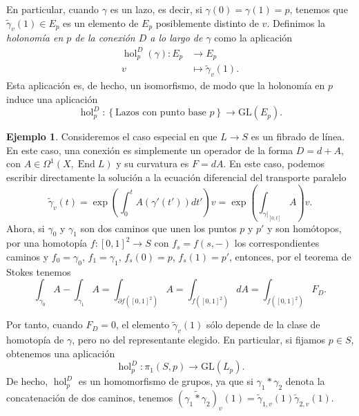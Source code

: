 \documentclass[12pt,a4paper]{article}
\theoremstyle{definition} \newtheorem{defn}[thm]{Definición}
\theoremstyle{definition} \newtheorem{ejemplo}[thm]{Ejemplo}
\theoremstyle{definition} \newtheorem{ejercicio}[thm]{Ejercicio}
\def\GL{\mathrm{GL}}
\DeclareMathOperator{\hol}{hol}
\DeclareMathOperator{\End}{End}
\begin{document}
	  En particular, cuando $\gamma$ es un lazo, es decir, si $\gamma(0)=\gamma(1)=p$, tenemos que $\tilde{\gamma}_v(1) \in E_p$ es un elemento de $E_p$ posiblemente distinto de $v$. Definimos la \emph{holonomía en $p$ de la conexión $D$ a lo largo de $\gamma$} como la aplicación
	  \begin{align*}
	    \hol^D_p(\gamma) :E_p &\longrightarrow E_p \\ 
	    v &\longmapsto \tilde{\gamma}_v(1).
	    \end{align*}
	    Esta aplicación es, de hecho, un isomorfismo, de modo que la holonomía en $p$ induce una aplicación
	    \begin{equation*}
	      \hol^D_p: \left\{ \text{Lazos con punto base $p$} \right\} \longrightarrow \GL(E_p).
	    \end{equation*}

	  \begin{ejemplo}
	    Consideremos el caso especial en que $L\rightarrow S$ es un fibrado de línea. En este caso, una conexión es simplemente un operador de la forma $D=d+A$, con $A\in \Omega^1(X,\End L)$ y su curvatura es $F=dA$. En este caso, podemos escribir directamente la solución a la ecuación diferencial del transporte paralelo
	    \begin{equation*}
	      \tilde{\gamma}_v(t) = \exp\left(\int_0^t A(\gamma'(t')) dt'\right) v = \exp\left(\int_{\gamma|_{[0,t]}} A\right) v.
	    \end{equation*}
	    Ahora, si $\gamma_0$ y $\gamma_1$ son dos caminos que unen los puntos $p$ y $p'$ y son homótopos, por una homotopía $f:[0,1]^2 \rightarrow S$ con $f_s=f(s,-)$ los correspondientes caminos y $f_0=\gamma_0$, $f_1=\gamma_1$, $f_s(0)=p$, $f_s(1)=p'$, entonces, por el teorema de Stokes tenemos
	    \begin{equation*}
	      \int_{\gamma_0} A - \int_{\gamma_1} A = \int_{\partial f([0,1]^2)} A = \int_{f([0,1]^2)} dA = \int_{f([0,1]^2)} F_D.
	    \end{equation*}

	    Por tanto, cuando $F_D=0$, el elemento $\tilde{\gamma}_v(1)$ sólo depende de la clase de homotopía de $\gamma$, pero no del representante elegido. En particular, si fijamos $p\in S$, obtenemos una aplicación
	    \begin{equation*}
	      \hol^D_p: \pi_1(S,p) \longrightarrow \GL(L_p).
	    \end{equation*}
	    De hecho, $\hol^D_p$ es un homomorfismo de grupos, ya que si $\gamma_1 * \gamma_2$ denota la concatenación de dos caminos, tenemos $(\widetilde{\gamma_1 * \gamma_2})_v(1) = \tilde{\gamma}_{1,v} (1) \tilde{\gamma}_{2,v} (1)$.
	  \end{ejemplo}
\end{document}
